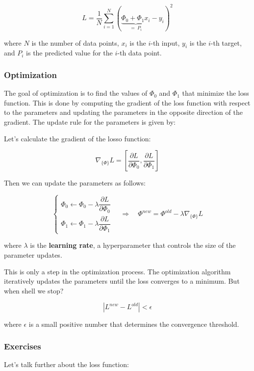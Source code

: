 $$
L = \dfrac 1N \sum_{i=1}^{N} (\underbrace{\Phi_0 + \Phi_1 x_i}_{= \ P_i} - y_i)^2
$$

where $N$ is the number of data points, $x_i$ is the $i$-th input, $y_i$ is the $i$-th target, and $P_i$ is the predicted value for the $i$-th data point.

\subsubsection{Optimization}

The goal of optimization is to find the values of $\Phi_0$ and $\Phi_1$ that minimize the loss function. This is done by computing the gradient of the loss function with respect to the parameters and updating the parameters in the opposite direction of the gradient. The update rule for the parameters is given by:

Let's calculate the gradient of the losso function:

$$
\nabla_{\{\Phi\}} L = \left[ \dfrac{\partial L}{\partial \Phi_0}, \dfrac{\partial L}{\partial \Phi_1} \right]
$$

Then we can update the parameters as follows:

$$
\begin{cases}
\Phi_0 \leftarrow \Phi_0 - \lambda \dfrac{\partial L}{\partial \Phi_0}\\
\Phi_1 \leftarrow \Phi_1 - \lambda \dfrac{\partial L}{\partial \Phi_1}
\end{cases}
\quad \Rightarrow \quad
\Phi^{new} = \Phi^{old} - \lambda \nabla_{\{\Phi\}} L
$$

where $\lambda$ is the \textbf{learning rate}, a hyperparameter that controls the size of the parameter updates.

This is only a step in the optimization process. The optimization algorithm iteratively updates the parameters until the loss converges to a minimum.
But when shell we stop?

$$
|L^{new} - L^{old}| < \epsilon
$$

where $\epsilon$ is a small positive number that determines the convergence threshold.

\newpage

\subsubsection{Exercises}

Let's talk further about the loss function:

